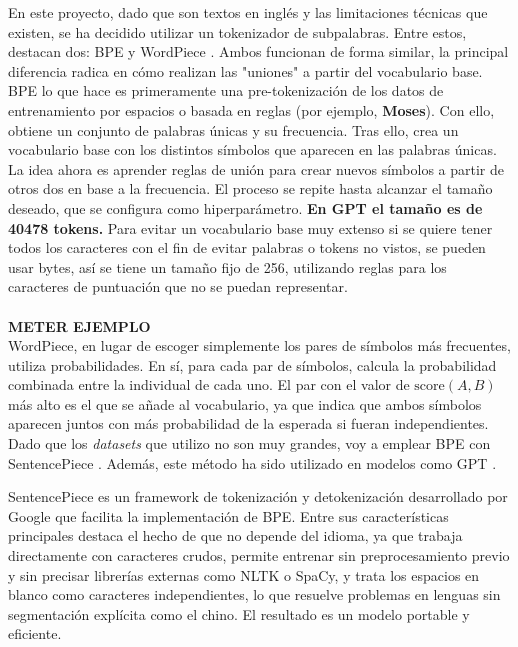 \documentclass[11pt]{book}
\theoremstyle{plain}
\theoremstyle{definition}
\begin{document}
En este proyecto, dado que son textos en inglés y las limitaciones técnicas que existen, se ha decidido utilizar un tokenizador de subpalabras. Entre estos, destacan dos: BPE y WordPiece \parencite{huggingface_tokenizer_summary}. Ambos funcionan de forma similar, la principal diferencia radica en cómo realizan las "uniones" a partir del vocabulario base. BPE lo que hace es primeramente una pre-tokenización de los datos de entrenamiento por espacios o basada en reglas (por ejemplo, \textbf{Moses}). Con ello, obtiene un conjunto de palabras únicas y su frecuencia. Tras ello, crea un vocabulario base con los distintos símbolos que aparecen en las palabras únicas. La idea ahora es aprender reglas de unión para crear nuevos símbolos a partir de otros dos en base a la frecuencia. El proceso se repite hasta alcanzar el tamaño deseado, que se configura como hiperparámetro. \textbf{En GPT el tamaño es de 40478 tokens.} Para evitar un vocabulario base muy extenso si se quiere tener todos los caracteres con el fin de evitar palabras o tokens no vistos, se pueden usar bytes, así se tiene un tamaño fijo de 256, utilizando reglas para los caracteres de puntuación que no se puedan representar. \\
\\
\textbf{METER EJEMPLO}\\

WordPiece, en lugar de escoger simplemente los pares de símbolos más frecuentes, utiliza probabilidades. En sí, para cada par de símbolos, calcula la probabilidad combinada entre la individual de cada uno. El par con el valor de $\text{score}(A,B)$ más alto es el que se añade al vocabulario, ya que indica que ambos símbolos aparecen juntos con más probabilidad de la esperada si fueran independientes.\\

Dado que los \textit{datasets} que utilizo no son muy grandes, voy a emplear BPE con SentencePiece \parencite{google_sentencepiece}. Además, este método ha sido utilizado en modelos como GPT \parencite{reddit2021tokenizers}. 

SentencePiece es un framework de tokenización y detokenización desarrollado por Google que facilita la implementación de BPE. Entre sus características principales destaca el hecho de que no depende del idioma, ya que trabaja directamente con caracteres crudos, permite entrenar sin preprocesamiento previo y sin precisar librerías externas como NLTK o SpaCy, y trata los espacios en blanco como caracteres independientes, lo que resuelve problemas en lenguas sin segmentación explícita como el chino. El resultado es un modelo portable y eficiente. 
\end{document}
